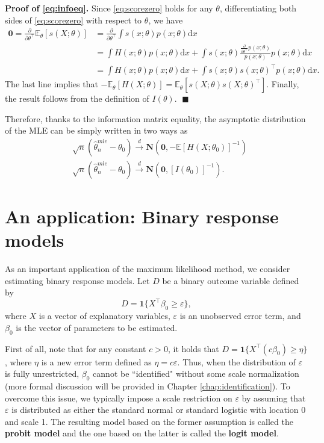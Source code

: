 \documentclass[10.5pt, A4paper, openany, uplatex]{book}
\newcommand{\mbf}{\mathbf}
\newcommand{\mrm}{\mathrm}
\newcommand{\eps}{\varepsilon}
\newcommand{\E}{\mathbb{E}}
\renewcommand{\hat}{\widehat}
\numberwithin{equation}{section}
\begin{document}
\textbf{Proof of \eqref{eq:infoeq}.} \quad Since \eqref{eq:scorezero} holds for any $\theta$, differentiating both sides of \eqref{eq:scorezero} with respect to $\theta$, we have
\begin{align*}
	\mbf{0} = \frac{\partial }{\partial \theta^\top} \E_\theta[s(X; \theta)] 
	& = \frac{\partial}{\partial \theta^\top}\int s(x; \theta) p(x; \theta) \mrm{d}x \\
	& = \int H(x; \theta) p(x; \theta) \mrm{d}x + \int s(x; \theta) \frac{\frac{\partial}{\partial \theta^\top} p(x; \theta)}{p(x; \theta)} p(x; \theta) \mrm{d}x \\
	& = \int H(x; \theta) p(x; \theta) \mrm{d}x + \int s(x; \theta) s(x; \theta)^\top p(x; \theta) \mrm{d}x.
\end{align*} 
The last line implies that $-\E_\theta[H(X; \theta)] = \E_\theta[s(X; \theta) s(X; \theta)^\top]$.
Finally, the result follows from the definition of $I(\theta)$. $\; \blacksquare$

Therefore, thanks to the information matrix equality, the asymptotic distribution of the MLE can be simply written in two ways as
\begin{align*}
	& \sqrt{n}(\hat \theta_n^{mle} - \theta_0) \overset{d}{\to} \mbf{N}\left( \mbf{0}, -\E[H(X; \theta_0)]^{-1}  \right) \\
	& \sqrt{n}(\hat \theta_n^{mle} - \theta_0) \overset{d}{\to} \mbf{N}\left( \mbf{0}, [I(\theta_0)]^{-1}  \right).
\end{align*}

\section{An application: Binary response models}\label{sec:binary}
As an important application of the maximum likelihood method, we consider estimating binary response models.
Let $D$ be a binary outcome variable defined by
\[
	D = \mbf{1}\{X^\top\beta_0 \ge \eps\},
\]
where $X$ is a vector of explanatory variables, $\eps$ is an unobserved error term, and $\beta_0$ is the vector of parameters to be estimated.

First of all, note that for any constant $c > 0$, it holds that  $D = \mbf{1}\{X^\top(c\beta_0) \ge \eta\}$, where $\eta$ is a new error term defined as $\eta = c\eps$.
Thus, when the distribution of $\eps$ is fully unrestricted, $\beta_0$ cannot be ``identified" without some scale normalization (more formal discussion will be provided in Chapter \ref{chap:identification}). 
To overcome this issue, we typically impose a scale restriction on $\eps$ by assuming that $\eps$ is distributed as either the standard normal or standard logistic with location 0 and scale 1.
The resulting model based on the former assumption is called the \textbf{probit model} and the one based on the latter is called the \textbf{logit model}.
\end{document}
